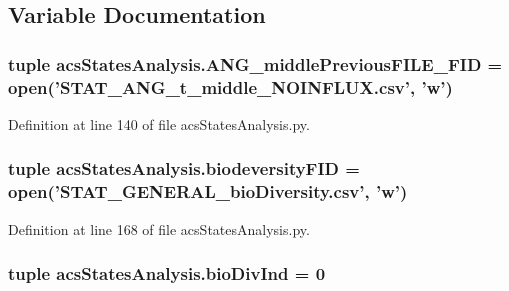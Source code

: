 \subsection{Variable Documentation}
\hypertarget{a00104_aa5eb16eef2c90e2ccc991eb176280f21}{
\subsubsection[{A\-N\-G\-\_\-middle\-Previous\-F\-I\-L\-E\-\_\-\-F\-I\-D}]{\setlength{\rightskip}{0pt plus 5cm}tuple acs\-States\-Analysis.\-A\-N\-G\-\_\-middle\-Previous\-F\-I\-L\-E\-\_\-\-F\-I\-D = open('S\-T\-A\-T\-\_\-\-A\-N\-G\-\_\-t\-\_\-middle\-\_\-\-N\-O\-I\-N\-F\-L\-U\-X.\-csv', 'w')}}\label{a00104_aa5eb16eef2c90e2ccc991eb176280f21}


Definition at line 140 of file acs\-States\-Analysis.\-py.

\hypertarget{a00104_a68c23cb79e89d9e14acf9ed09f46f0e4}{
\subsubsection[{biodeversity\-F\-I\-D}]{\setlength{\rightskip}{0pt plus 5cm}tuple acs\-States\-Analysis.\-biodeversity\-F\-I\-D = open('S\-T\-A\-T\-\_\-\-G\-E\-N\-E\-R\-A\-L\-\_\-bio\-Diversity.\-csv', 'w')}}\label{a00104_a68c23cb79e89d9e14acf9ed09f46f0e4}


Definition at line 168 of file acs\-States\-Analysis.\-py.

\hypertarget{a00104_a247328d05f06695b0c2de9a001ca4548}{
\subsubsection[{bio\-Div\-Ind}]{\setlength{\rightskip}{0pt plus 5cm}tuple acs\-States\-Analysis.\-bio\-Div\-Ind = 0}}\label{a00104_a247328d05f06695b0c2de9a001ca4548}


